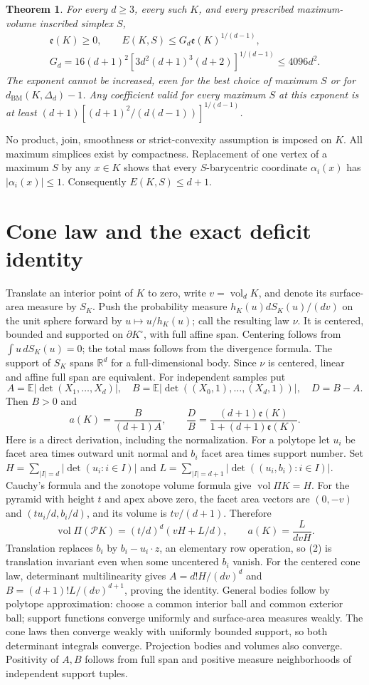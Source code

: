 \documentclass[11pt]{article}
\newtheorem{theorem}{Theorem}[section]
\newcommand{\vol}{\operatorname{vol}}
\newcommand{\BM}{d_{\mathrm{BM}}}
\newcommand{\ee}{\mathfrak e}
\newcommand{\E}{\mathbb E}
\newcommand{\R}{\mathbb R}
\begin{document}
\begin{theorem}\label{thm:main}
For every $d\ge3$, every such $K$, and every prescribed maximum-volume
inscribed simplex $S$,
\[
\begin{gathered}
\ee(K)\ge0,\qquad E(K,S)\le G_d\ee(K)^{1/(d-1)},\\
G_d=16(d+1)^2[3d^2(d+1)^3(d+2)]^{1/(d-1)}\le4096d^2.
\end{gathered}
\]
The exponent cannot be increased, even for the best choice of maximum $S$
or for $\BM(K,\Delta_d)-1$. Any coefficient valid for every maximum $S$
at this exponent is at least
$(d+1)[(d+1)^2/(d(d-1))]^{1/(d-1)}$.
\end{theorem}
No product, join, smoothness or strict-convexity assumption is imposed on $K$.
All maximum simplices exist by compactness. Replacement of one vertex of a
maximum $S$ by any $x\in K$ shows that every $S$-barycentric coordinate
$\alpha_i(x)$ has $|\alpha_i(x)|\le1$. Consequently $E(K,S)\le d+1$.

\section{Cone law and the exact deficit identity}
Translate an interior point of $K$ to zero, write $v=\vol_d K$, and denote its
surface-area measure by $S_K$. Push the probability measure
$h_K(u)dS_K(u)/(dv)$ on the unit sphere forward by $u\mapsto u/h_K(u)$;
call the resulting law $\nu$. It is centered, bounded and supported on
$\partial K^\circ$, with full affine span. Centering follows from
$\int u\,dS_K(u)=0$; the total mass follows from the divergence formula.
The support of $S_K$ spans $\R^d$ for a full-dimensional body. Since $\nu$ is
centered, linear and affine full span are equivalent. For independent samples
put
\[
A=\E|\det(X_1,\ldots,X_d)|,\quad
B=\E|\det((X_0,1),\ldots,(X_d,1))|,\quad D=B-A.
\]
Then $B>0$ and
\[
a(K)=\frac B{(d+1)A},\qquad
\frac DB=\frac{(d+1)\ee(K)}{1+(d+1)\ee(K)}.
\]
Here is a direct derivation, including the normalization. For a polytope let
$u_i$ be facet area times outward unit normal and $b_i$ facet area times support
number. Set $H=\sum_{|I|=d}|\det(u_i:i\in I)|$ and
$L=\sum_{|I|=d+1}|\det((u_i,b_i):i\in I)|$. Cauchy's formula and the
zonotope volume formula give $\vol\Pi K=H$. For the pyramid with height $t$
and apex above zero, the facet area vectors are
$(0,-v)$ and $(t u_i/d,b_i/d)$, and its volume is $tv/(d+1)$. Therefore
\[
\vol\Pi(\mathcal P K)=(t/d)^d(vH+L/d),\qquad
a(K)=\frac L{dvH}. \tag{2}
\]
Translation replaces $b_i$ by $b_i-u_i\cdot z$, an elementary row operation,
so (2) is translation invariant even when some uncentered $b_i$ vanish.
For the centered cone law, determinant multilinearity gives
$A=d!H/(dv)^d$ and $B=(d+1)!L/(dv)^{d+1}$, proving the identity.
General bodies follow by polytope approximation: choose a common interior
ball and common exterior ball; support functions converge uniformly and
surface-area measures weakly. The cone laws then converge weakly with uniformly
bounded support, so both determinant integrals converge. Projection bodies and
volumes also converge. Positivity of $A,B$ follows from full span and positive
measure neighborhoods of independent support tuples.
\end{document}
